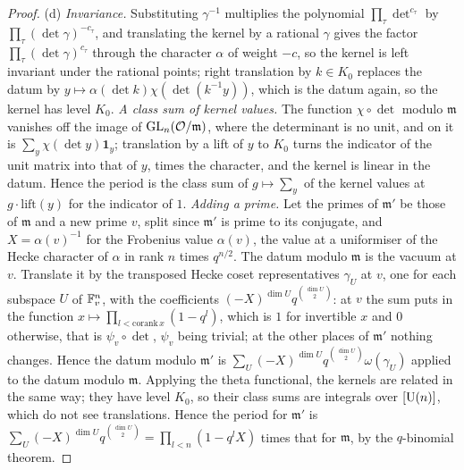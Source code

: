 \begin{proof}
(d) \emph{Invariance.} Substituting $\gamma^{-1}$ multiplies the polynomial $\prod_\tau\det^{c_\tau}$ by $\prod_\tau(\det\gamma)^{-c_\tau}$, and translating the kernel by a rational $\gamma$ gives the factor $\prod_\tau(\det\gamma)^{c_\tau}$ through the
character $\alpha$ of weight $-c$, so the kernel is left invariant under the rational points; right translation by $k\in K_0$ replaces the datum by $y\mapsto\alpha(\det k)\chi(\det(k^{-1}y))$, which is the datum again, so
the kernel has level $K_0$. \emph{A class sum of kernel values.} The function $\chi\circ\det$ modulo $\mathfrak m$ vanishes off the image of $\operatorname{GL}_n(\mathcal{O}/\mathfrak m)$, where the determinant is no unit, and on it is
$\sum_y\chi(\det y)\mathbf 1_y$; translation by a lift of $y$ to $K_0$ turns the indicator of the unit matrix into that of $y$, times the character, and the kernel is linear in the datum. Hence the period is the class sum of $g\mapsto\sum_y$ of the
kernel values at $g\cdot\mathrm{lift}(y)$ for the indicator of $1$. \emph{Adding a prime.} Let the primes of $\mathfrak m'$ be those of $\mathfrak m$ and a new prime $v$, split since $\mathfrak m'$ is prime to its conjugate, and
$X=\alpha(v)^{-1}$ for the Frobenius value $\alpha(v)$, the value at a uniformiser of the Hecke character of $\alpha$ in rank $n$ times $q^{n/2}$. The datum modulo $\mathfrak m$ is the vacuum at $v$. Translate it by the transposed Hecke
coset representatives $\gamma_U$ at $v$, one for each subspace $U$ of $\mathbb{F}_v^n$, with the coefficients $(-X)^{\dim U}q^{\binom{\dim U}2}$: at $v$ the sum puts in the function $x\mapsto\prod_{l<\mathrm{corank}\,x}(1-q^l)$, which is $1$ for invertible $x$ and $0$
otherwise, that is $\psi_v\circ\det$, $\psi_v$ being trivial; at the other places of $\mathfrak m'$ nothing changes. Hence the datum modulo $\mathfrak m'$ is $\sum_U(-X)^{\dim U}q^{\binom{\dim U}2}\omega(\gamma_U)$ applied to the datum modulo $\mathfrak m$.
Applying the theta functional, the kernels are related in the same way; they have level $K_0$, so their class sums are integrals over $[\operatorname{U}(n)]$, which do not see translations. Hence the period for $\mathfrak m'$ is
$\sum_U(-X)^{\dim U}q^{\binom{\dim U}2}=\prod_{l<n}(1-q^lX)$ times that for $\mathfrak m$, by the $q$-binomial theorem.
\end{proof}

